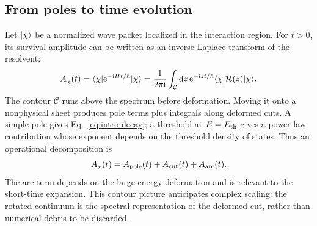 \subsection{From poles to time evolution}
\label{subsec:poles-time}

Let $\lvert \chi \rangle$ be a normalized wave packet localized in the interaction
region.  For $t>0$, its survival amplitude can be written as an inverse
Laplace transform of the resolvent:
\begin{equation}
  A_{\chi}(t)
  =\langle \chi \rvert\mathrm{e}^{-\mathrm{i} Ht/\hbar}\lvert \chi \rangle
  =\frac{1}{2\pi\mathrm{i}}
  \int_{\mathcal C}\mathrm{d} z\,
  \mathrm{e}^{-\mathrm{i} zt/\hbar}
  \langle \chi \rvert\mathcal{R}(z)\lvert \chi \rangle .
  \label{eq:inverse-laplace}
\end{equation}
The contour $\mathcal C$ runs above the spectrum before deformation.  Moving
it onto a nonphysical sheet produces pole terms plus integrals along deformed
cuts.  A simple pole gives Eq.~\eqref{eq:intro-decay}; a threshold at
$E=E_{\mathrm{th}}$ gives a power-law contribution whose exponent depends on
the threshold density of states.  Thus an operational decomposition is
\begin{equation}
  A_{\chi}(t)
  =A_{\mathrm{pole}}(t)
  +A_{\mathrm{cut}}(t)
  +A_{\mathrm{arc}}(t) .
  \label{eq:time-decomposition}
\end{equation}
The arc term depends on the large-energy deformation and is relevant to the
  short-time expansion.  This contour picture anticipates complex scaling: the
  rotated continuum is the spectral representation of the deformed cut, rather
  than numerical debris to be discarded.

